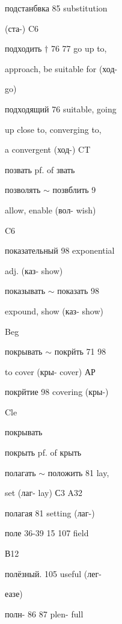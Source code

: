 \clearpage
\thispagestyle{plain}
\begingroup
\cyrillicfont
\fontsize{7.25}{8.25}\selectfont
\setlength{\parindent}{0pt}
\setlength{\parskip}{0pt}
\setlength{\emergencystretch}{1.5em}
\noindent
\begin{minipage}[t]{0.475\textwidth}
\raggedright
\noindent подстанбвка 85 substitution\par
\noindent (ста-) C6\par
\noindent подходить $\dagger$ 76 77 go up to,\par
\noindent approach, be suitable for (ход-\par
\noindent go)\par
\noindent подходящий 76 suitable, going\par
\noindent up close to, converging to,\par
\noindent a convergent (ход-) CT\par
\noindent позвать pf. of звать\par
\noindent позволять $\sim$ позвблить 9\par
\noindent allow, enable (вол- wish)\par
\noindent C6\par
\noindent показательный 98 exponential\par
\noindent adj. (каз- show)\par
\noindent показывать $\sim$ показать 98\par
\noindent expound, show (каз- show)\par
\noindent Beg\par
\noindent покрывать $\sim$ покрйть 71 98\par
\noindent to cover (кры- cover) АР\par
\noindent покрйтие 98 covering (кры-)\par
\noindent Cle\par
\noindent покрывать\par
\noindent покрыть pf. of крыть\par
\noindent полагать $\sim$ положить 81 lay,\par
\noindent set (лаг- lay) С3 A32\par
\noindent полагая 81 setting (лаг-)\par
\noindent поле 36-39 15 107 field\par
\noindent В12\par
\noindent полёзный. 105 useful (лег-\par
\noindent еазе)\par
\noindent полн- 86 87 plen- full\par

\end{minipage}
